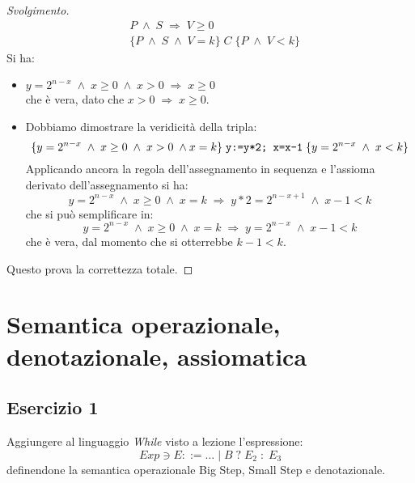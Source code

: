 \documentclass[a4paper, 10pt]{article} %
\begin{document}
\begin{proof}[Svolgimento]
\begin{align*}
& P \; \land \; S \; \Rightarrow \; V \geq 0 \\
& \{P \; \land \; S \; \land \; V=k \} \; C \; \{ P \; \land \; V <k \} 
\end{align*}
Si ha:
\begin{itemize}
\item $ y=2^{n-x} \; \land \; x \geq 0 \; \land \; x>0 \; \Rightarrow \; x \geq 0 $ \\
	  che è vera, dato che $ x>0 \; \Rightarrow \; x \geq 0 $.
\item Dobbiamo dimostrare la veridicità della tripla:
		$$ \{y=2^{n-x} \; \land \; x \geq 0 \; \land \; x>0 \; \land x=k \} \; 
		\text{\texttt{y:=y*2; x=x-1}} 
		\; \{y=2^{n-x} \; \land \; x < k \} $$
	  Applicando ancora la regola dell'assegnamento in sequenza e l'assioma derivato dell'assegnamento si ha:
	  $$ y = 2^{n-x} \; \land \; x \geq 0 \; \land \; x=k \;
	     \Rightarrow 
	     \; y*2 = 2^{n-x+1} \; \land \; x-1<k $$ 
	  che si può semplificare in:
	  $$ y = 2^{n-x} \; \land \; x \geq 0 \; \land \; x=k \;
	     \Rightarrow 
	     \; y = 2^{n-x} \; \land \; x-1<k $$ 
	  che è vera, dal momento che si otterrebbe $ k-1<k $.
\end{itemize}

Questo prova la correttezza totale.
\end{proof}

\section{Semantica operazionale, denotazionale, assiomatica}

\subsection{Esercizio 1}
Aggiungere al linguaggio \emph{While} visto a lezione l'espressione:
$$ Exp \ni E ::= \dots \; | \; B \; ? \; E_2 \; : \; E_3 $$
definendone la semantica operazionale Big Step, Small Step e denotazionale.
\end{document}
